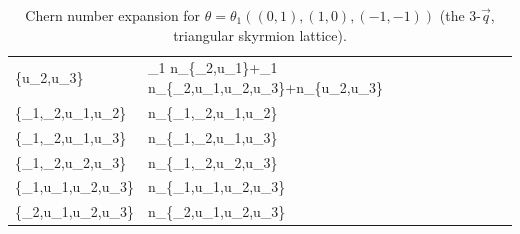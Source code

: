 \documentclass[
    10pt,
    aps,
    prb,
	longbibliography,
    twocolumn,
    floatfix,
    superscriptaddress,
]{revtex4-2}
\begin{document}
\begin{turnpage}
\begin{table}
\begin{tabular}{L|L}
		\left\{u_2,u_3\right\} & \theta _1 n_{\left\{\tau _2,u_1\right\}}+\theta _1
		n_{\left\{\tau _2,u_1,u_2,u_3\right\}}+n_{\left\{u_2,u_3\right\}} \\
		\left\{\tau _1,\tau _2,u_1,u_2\right\} & n_{\left\{\tau _1,\tau _2,u_1,u_2\right\}} \\
		\left\{\tau _1,\tau _2,u_1,u_3\right\} & n_{\left\{\tau _1,\tau _2,u_1,u_3\right\}} \\
		\left\{\tau _1,\tau _2,u_2,u_3\right\} & n_{\left\{\tau _1,\tau _2,u_2,u_3\right\}} \\
		\left\{\tau _1,u_1,u_2,u_3\right\} & n_{\left\{\tau _1,u_1,u_2,u_3\right\}} \\
		\left\{\tau _2,u_1,u_2,u_3\right\} & n_{\left\{\tau _2,u_1,u_2,u_3\right\}}
	\end{tabular}
	\caption{Chern number expansion for $ \theta = \theta_1 (( 
		0, 1),
		(  1,0 ),
		( -1,-1 )) $ (the 3-$\vec{q}$, triangular skyrmion lattice).}
	\label{tab:3q_2d}
	\end{table}
\end{turnpage}
\end{document}
